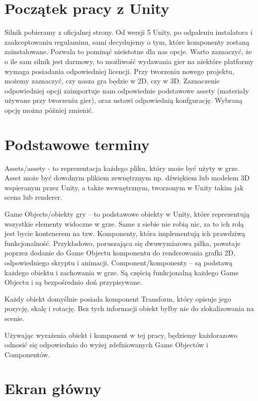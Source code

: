\documentclass[12pt]{xmgr}
\begin{document}
\section{Początek pracy z Unity}

Silnik pobieramy z oficjalnej strony. Od wersji 5 Unity, po odpaleniu instalatora i zaakceptowaniu regulaminu, sami decydujemy o tym, które komponenty zostaną zainstalowane. Pozwala to pominąć nieistotne dla nas opcje. Warto zaznaczyć, że o ile sam silnik jest darmowy, to możliwość wydawania gier na niektóre platformy wymaga posiadania odpowiedniej licencji. Przy tworzeniu nowego projektu, możemy zaznaczyć, czy nasza gra będzie w 2D, czy w 3D. Zaznaczenie odpowiedniej opcji zaimportuje nam odpowiednie podstawowe assety (materiały używane przy tworzeniu gier), oraz ustawi odpowiednią konfgurację.
Wybraną opcję można później zmienić.

\section{Podstawowe terminy}

\quad Assets/assety - to reprezentacja każdego pliku, który może być użyty w grze. Asset może być dowolnym plikiem zewnętrznym np. dźwiękiem lub modelem 3D wspieranym przez Unity, a także wewnętrznym, tworzonym w Unity takim jak scena lub renderer.

Game Objects/obiekty gry – to podstawowe obiekty w Unity, które reprezentują wszystkie elementy widoczne w grze. Same z siebie nie robią nic, za to ich rolą jest bycie kontenerem na tzw. Komponenty, która implementują ich prawdziwą funkcjonalność. Przykładowo, poruszająca się dwuwymiarowa piłka, powstaje poprzez dodanie do Game Objectu komponentu do renderowania grafki 2D, odpowiedniego skryptu i animacji. 
Component/komponenty – są podstawą każdego obiektu i zachowania w grze. Są częścią funkcjonalną każdego Game Objectu i są bezpośrednio doń przypisywane.

Każdy obiekt domyślnie posiada komponent Transform, który opisuje jego pozycję, skalę i rotację. Bez tych informacji obiekt byłby nie do zlokalizowania na scenie.

Używając wyrażenia obiekt i komponent w tej pracy, będziemy każdorazowo odnosić się odpowiednio do wyżej zdefniowanych Game Objectów i Componentów.

\newpage
\section{Ekran główny}
\end{document}

